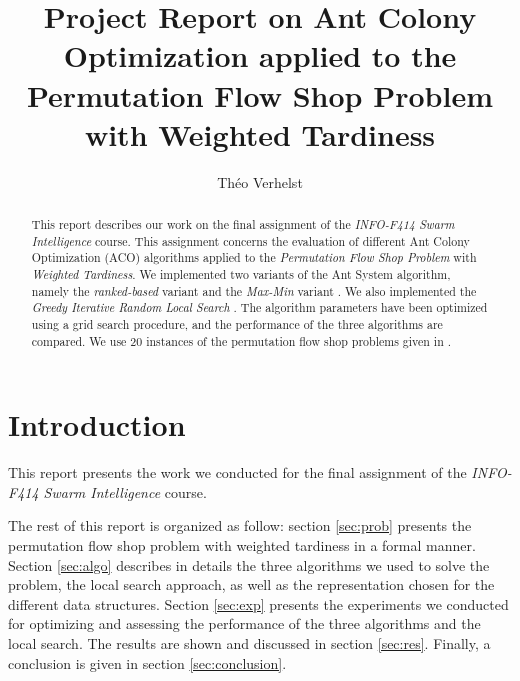 \documentclass[runningheads]{llncs}
\begin{document}
\title{Project Report on Ant Colony Optimization applied to the Permutation Flow Shop Problem with Weighted Tardiness}


\author{Théo Verhelst}


\maketitle

\begin{abstract}

This report describes our work on the final assignment of the \emph{INFO-F414
Swarm Intelligence} course. This assignment concerns the evaluation of different
Ant Colony Optimization (ACO) algorithms applied to the \emph{Permutation Flow
Shop Problem} with \emph{Weighted Tardiness}. We implemented two variants of the
Ant System algorithm, namely the \emph{ranked-based} variant and the
\emph{Max-Min} variant \cite{stutzle1998ant}. We also implemented the
\emph{Greedy Iterative Random Local Search} \cite{karabulut2016hybrid}. The
algorithm parameters have been optimized using a grid search procedure, and the
performance of the three algorithms are compared. We use 20 instances of the
permutation flow shop problems given in \cite{taillard1993benchmarks}.

\end{abstract}

\section{Introduction}

This report presents the work we conducted for the final assignment of the
\emph{INFO-F414 Swarm Intelligence} course.

The rest of this report is organized as follow: section \ref{sec:prob} presents
the permutation flow shop problem with weighted tardiness in a formal manner.
Section \ref{sec:algo} describes in details the three algorithms we used to
solve the problem, the local search approach, as well as the representation
chosen for the different data structures. Section \ref{sec:exp} presents the
experiments we conducted for optimizing and assessing the performance of the
three algorithms and the local search. The results are shown and discussed in
section \ref{sec:res}. Finally, a conclusion is given in section
\ref{sec:conclusion}.
\end{document}

